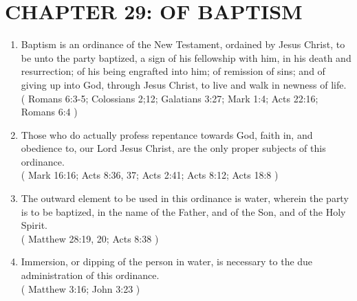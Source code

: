 \documentclass[12pt,a4paper]{book}
\begin{document}
\chapter{CHAPTER 29: OF BAPTISM}
\label{ch-bapm}
\begin{enumerate}
\item Baptism is an ordinance of the New Testament, ordained by Jesus Christ, to be unto the party baptized, a sign of his fellowship with him, in his death and resurrection; of his being engrafted into him; of remission of sins; and of giving up into God, through Jesus Christ, to live and walk in newness of life.\\
( Romans 6:3-5; Colossians 2;12; Galatians 3:27; Mark 1:4; Acts 22:16; Romans 6:4 )
\item Those who do actually profess repentance towards God, faith in, and obedience to, our Lord Jesus Christ, are the only proper subjects of this ordinance.\\
( Mark 16:16; Acts 8:36, 37; Acts 2:41; Acts 8:12; Acts 18:8 )
\item The outward element to be used in this ordinance is water, wherein the party is to be baptized, in the name of the Father, and of the Son, and of the Holy Spirit.\\
( Matthew 28:19, 20; Acts 8:38 )
\item Immersion, or dipping of the person in water, is necessary to the due administration of this ordinance.\\
( Matthew 3:16; John 3:23 )
\end{enumerate}
\end{document}
